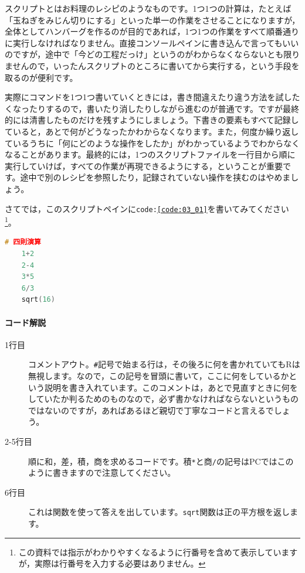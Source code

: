 \documentclass{ltjsbook}
\begin{document}
スクリプトとはお料理のレシピのようなものです。1つ1つの計算は，たとえば「玉ねぎをみじん切りにする」といった単一の作業をさせることになりますが，全体としてハンバーグを作るのが目的であれば，1つ1つの作業をすべて順番通りに実行しなければなりません。直接コンソールペインに書き込んで言ってもいいのですが，途中で「今どの工程だっけ」というのがわからなくならないとも限りませんので，いったんスクリプトのところに書いてから実行する，という手段を取るのが便利です。

実際にコマンドを1つ1つ書いていくときには，書き間違えたり違う方法を試したくなったりするので，書いたり消したりしながら進むのが普通です。ですが最終的には清書したものだけを残すようにしましょう。下書きの要素もすべて記録していると，あとで何がどうなったかわからなくなります。また，何度か繰り返しているうちに「何にどのような操作をしたか」がわかっているようでわからなくなることがあります。最終的には，1つのスクリプトファイルを一行目から順に実行していけば，すべての作業が再現できるようにする，ということが重要です。途中で別のレシピを参照したり，記録されていない操作を挟むのはやめましょう。

さてでは，このスクリプトペインに\texttt{code:\ref{code:03_01}}を書いてみてください\footnote{この資料では指示がわかりやすくなるように行番号を含めて表示していますが，実際は行番号を入力する必要はありません。}。

\begin{lstlisting}[language=c++,label={code:03_01},caption={四則演算のコード}]
	# 四則演算
	1+2
	2-4
	3*5
	6/3
	sqrt(16)
\end{lstlisting}

\paragraph{コード解説}
\begin{description}
	\item[1行目] コメントアウト。\verb|#|記号で始まる行は，その後ろに何を書かれていてもRは無視します。なので，この記号を冒頭に書いて，ここに何をしているかという説明を書き入れています。このコメントは，あとで見直すときに何をしていたか判るためのものなので，必ず書かなければならないというものではないのですが，あればあるほど親切で丁寧なコードと言えるでしょう。
	\item[2-5行目] 順に和，差，積，商を求めるコードです。積\verb|*|と商\verb|/|の記号はPCではこのように書きますので注意してください。
	\item[6行目] これは関数を使って答えを出しています。\texttt{sqrt}関数は正の平方根を返します。
\end{description}
\end{document}
